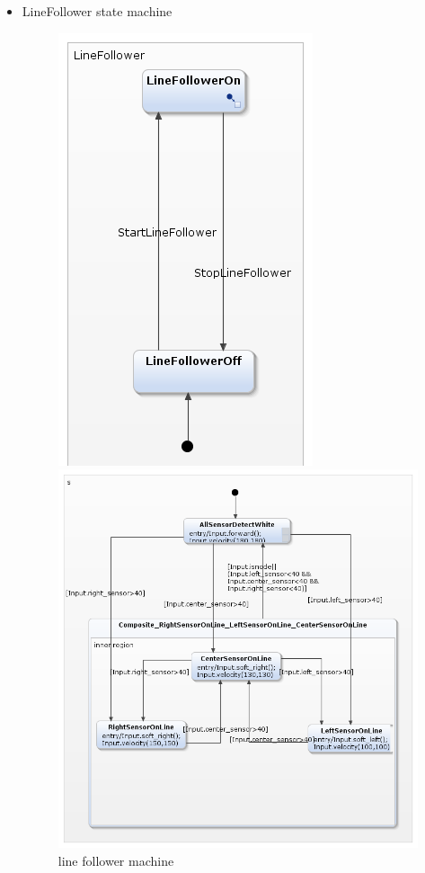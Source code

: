 \documentclass[a4paper,12pt,oneside]{book}
\begin{document}
\begin{itemize}
\item LineFollower state machine

\begin{figure}[!htbp]
	\begin{minipage}{0.45\textwidth}
	\centering
	\includegraphics[scale=.7]{linefollower.png}
	\caption{line follower machine}
\end{minipage}
	\begin{minipage}{0.45\textwidth}
	\centering
	\includegraphics[scale=.6]{linefollower_on.png}

\end{minipage}
\end{figure}
\end{itemize}
\end{document}
